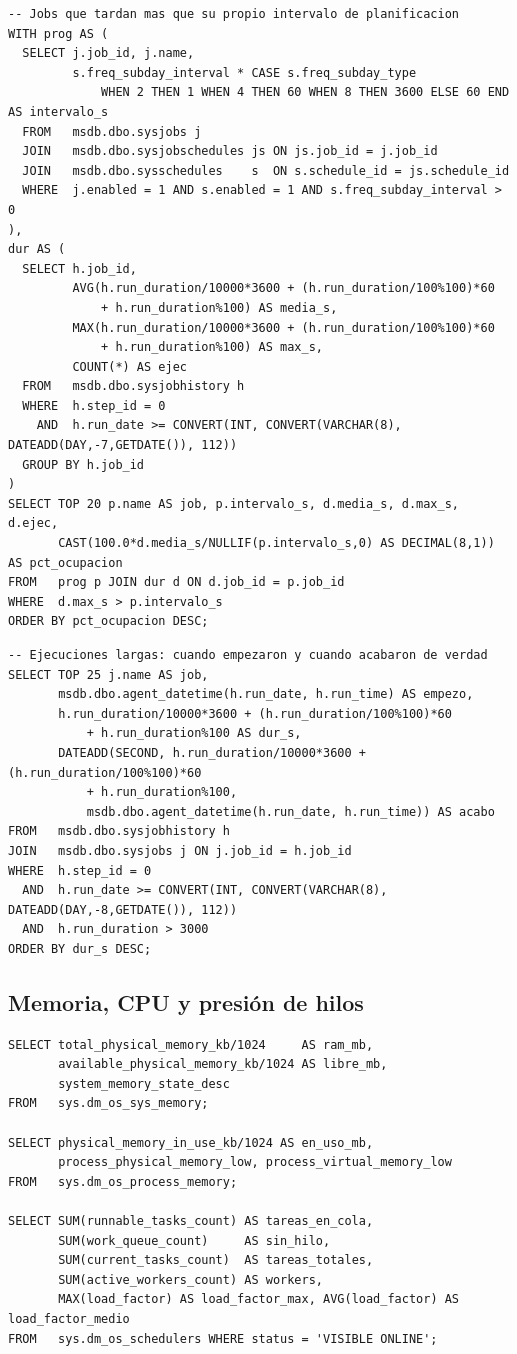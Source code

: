 \documentclass[11pt,a4paper]{article}
\begin{document}
\begin{lstlisting}[style=sql]
-- Jobs que tardan mas que su propio intervalo de planificacion
WITH prog AS (
  SELECT j.job_id, j.name,
         s.freq_subday_interval * CASE s.freq_subday_type
             WHEN 2 THEN 1 WHEN 4 THEN 60 WHEN 8 THEN 3600 ELSE 60 END AS intervalo_s
  FROM   msdb.dbo.sysjobs j
  JOIN   msdb.dbo.sysjobschedules js ON js.job_id = j.job_id
  JOIN   msdb.dbo.sysschedules    s  ON s.schedule_id = js.schedule_id
  WHERE  j.enabled = 1 AND s.enabled = 1 AND s.freq_subday_interval > 0
),
dur AS (
  SELECT h.job_id,
         AVG(h.run_duration/10000*3600 + (h.run_duration/100%100)*60
             + h.run_duration%100) AS media_s,
         MAX(h.run_duration/10000*3600 + (h.run_duration/100%100)*60
             + h.run_duration%100) AS max_s,
         COUNT(*) AS ejec
  FROM   msdb.dbo.sysjobhistory h
  WHERE  h.step_id = 0
    AND  h.run_date >= CONVERT(INT, CONVERT(VARCHAR(8), DATEADD(DAY,-7,GETDATE()), 112))
  GROUP BY h.job_id
)
SELECT TOP 20 p.name AS job, p.intervalo_s, d.media_s, d.max_s, d.ejec,
       CAST(100.0*d.media_s/NULLIF(p.intervalo_s,0) AS DECIMAL(8,1)) AS pct_ocupacion
FROM   prog p JOIN dur d ON d.job_id = p.job_id
WHERE  d.max_s > p.intervalo_s
ORDER BY pct_ocupacion DESC;
\end{lstlisting}

\begin{lstlisting}[style=sql]
-- Ejecuciones largas: cuando empezaron y cuando acabaron de verdad
SELECT TOP 25 j.name AS job,
       msdb.dbo.agent_datetime(h.run_date, h.run_time) AS empezo,
       h.run_duration/10000*3600 + (h.run_duration/100%100)*60
           + h.run_duration%100 AS dur_s,
       DATEADD(SECOND, h.run_duration/10000*3600 + (h.run_duration/100%100)*60
           + h.run_duration%100,
           msdb.dbo.agent_datetime(h.run_date, h.run_time)) AS acabo
FROM   msdb.dbo.sysjobhistory h
JOIN   msdb.dbo.sysjobs j ON j.job_id = h.job_id
WHERE  h.step_id = 0
  AND  h.run_date >= CONVERT(INT, CONVERT(VARCHAR(8), DATEADD(DAY,-8,GETDATE()), 112))
  AND  h.run_duration > 3000
ORDER BY dur_s DESC;
\end{lstlisting}

\subsection{Memoria, CPU y presión de hilos}

\begin{lstlisting}[style=sql]
SELECT total_physical_memory_kb/1024     AS ram_mb,
       available_physical_memory_kb/1024 AS libre_mb,
       system_memory_state_desc
FROM   sys.dm_os_sys_memory;

SELECT physical_memory_in_use_kb/1024 AS en_uso_mb,
       process_physical_memory_low, process_virtual_memory_low
FROM   sys.dm_os_process_memory;

SELECT SUM(runnable_tasks_count) AS tareas_en_cola,
       SUM(work_queue_count)     AS sin_hilo,
       SUM(current_tasks_count)  AS tareas_totales,
       SUM(active_workers_count) AS workers,
       MAX(load_factor) AS load_factor_max, AVG(load_factor) AS load_factor_medio
FROM   sys.dm_os_schedulers WHERE status = 'VISIBLE ONLINE';
\end{lstlisting}
\end{document}
